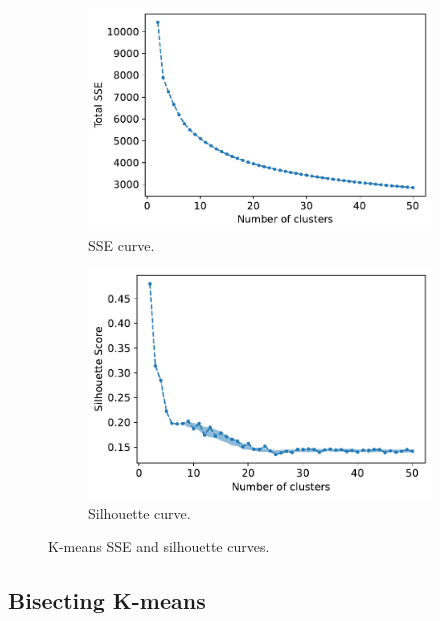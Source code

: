 \documentclass[10pt, a4paper, twocolumn]{article}
\begin{document}
\begin{figure}
    \centering
    \begin{subfigure}[t]{0.49\columnwidth}
        \includegraphics[width=\linewidth]{immagini simone/SSE_curve_kmeans.pdf}
        \caption{SSE curve.}
        \label{fig:sse_kmeans}        
    \end{subfigure}
    \begin{subfigure}[t]{0.49\columnwidth}
        \includegraphics[width=\linewidth]{immagini simone/silhouete_curve_kmeans.pdf}
        \caption{Silhouette curve.}
        \label{fig:silh_kmeans}
    \end{subfigure}
    \caption{K-means SSE and silhouette curves.}
    \label{fig:kmeans_sse_silh}
\end{figure}


\subsection*{Bisecting K-means}
\end{document}
